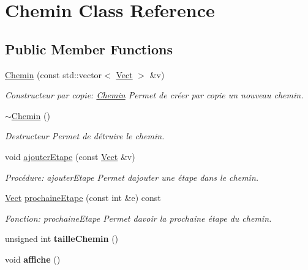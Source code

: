 \hypertarget{classChemin}{}\section{Chemin Class Reference}
\label{classChemin}
\subsection*{Public Member Functions}
\begin{DoxyCompactItemize}
\item 
\hyperlink{classChemin_acbb44d2dd9c7eda79740c3ddb2b435c5}{Chemin} (const std\+::vector$<$ \hyperlink{classVect}{Vect} $>$ \&v)
\begin{DoxyCompactList}\small\item\em Constructeur par copie\+: \hyperlink{classChemin}{Chemin} Permet de créer par copie un nouveau chemin. \end{DoxyCompactList}\item 
\mbox{\label{classChemin_a0024ec1de3487b44a51c095aca1b83dc}} 
\hyperlink{classChemin_a0024ec1de3487b44a51c095aca1b83dc}{$\sim$\+Chemin} ()
\begin{DoxyCompactList}\small\item\em Destructeur Permet de détruire le chemin. \end{DoxyCompactList}\item 
void \hyperlink{classChemin_a4cdbe032bca015c52dccbef4fa2cb647}{ajouter\+Etape} (const \hyperlink{classVect}{Vect} \&v)
\begin{DoxyCompactList}\small\item\em Procédure\+: ajouter\+Etape Permet d\textquotesingle{}ajouter une étape dans le chemin. \end{DoxyCompactList}\item 
\hyperlink{classVect}{Vect} \hyperlink{classChemin_ad01a7ae60fd0b51cc18281c031ea9c97}{prochaine\+Etape} (const int \&e) const
\begin{DoxyCompactList}\small\item\em Fonction\+: prochaine\+Etape Permet d\textquotesingle{}avoir la prochaine étape du chemin. \end{DoxyCompactList}\item 
\mbox{\label{classChemin_a7153e040b29f294f30793a698cde23b3}} 
unsigned int {\bfseries taille\+Chemin} ()
\item 
\mbox{\label{classChemin_aca468327c0fc8ce57727bc13edfa741e}} 
void {\bfseries affiche} ()
\end{DoxyCompactItemize}



